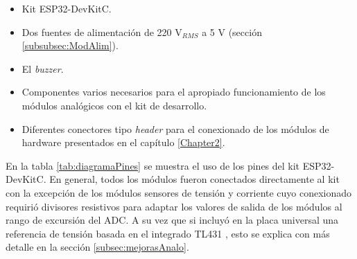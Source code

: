 \begin{itemize}
\item Kit ESP32-DevKitC.
\item Dos fuentes de alimentación de 220 V$_{RMS}$ a 5 V (sección \ref{subsubsec:ModAlim}).
\item El \textit{buzzer}. 
\item Componentes varios necesarios para el apropiado funcionamiento de los módulos analógicos con el kit de desarrollo.
\item Diferentes conectores tipo \textit{header} para el conexionado de los módulos de hardware presentados en el capítulo \ref{Chapter2}.
\end{itemize}

En la tabla \ref{tab:diagramaPines} se muestra el uso de los pines del kit ESP32-DevKitC. En general, todos los módulos fueron conectados directamente al kit con la excepción de los módulos sensores de tensión y corriente cuyo conexionado requirió divisores resistivos para adaptar los valores de salida de los módulos al rango de excursión del ADC. A su vez que si incluyó en la placa universal una referencia de tensión basada en el integrado TL431 \citep{TL431}, esto se explica con más detalle en la sección \ref{subsec:mejorasAnalo}.

